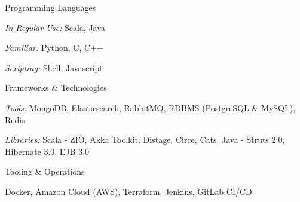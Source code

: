 

\begin{cvskills}

  \cvskill
  {Programming Languages} %
  {
  \begin{cvskillsitems} %
    \item {\emph{In Regular Use:} Scala, Java} %
    \item {\emph{Familiar:} Python, C, C++} %
    \item {\emph{Scripting:} Shell, Javascript} %
  \end{cvskillsitems}
  }

  \cvskill
  {Frameworks \& Technologies} %
  {
  \begin{cvskillsitems} %
    \item {\emph{Tools:} MongoDB, Elasticsearch, RabbitMQ, RDBMS (PostgreSQL \& MySQL), Redis} %
    \item {\emph{Libraries:} Scala - ZIO, Akka Toolkit, Distage, Circe, Cats; Java - Struts 2.0, Hibernate 3.0, EJB 3.0} %
  \end{cvskillsitems}
  }


  \cvskill
  {Tooling \& Operations} %
  {
  \begin{cvskillsitems} %
    \item {Docker, Amazon Cloud (AWS), Terraform, Jenkins, GitLab CI/CD } %
  \end{cvskillsitems}
  }

\end{cvskills}
